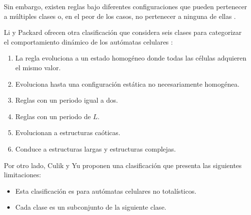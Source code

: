 Sin embargo, existen reglas bajo diferentes configuraciones que pueden pertenecer a múltiples clases o, en el peor de los casos, no pertenecer a ninguna de ellas \cite{genaro2000_campo_promedio}. 

Li y Packard ofrecen otra clasificación que considera seis clases para categorizar el comportamiento dinámico de los autómatas celulares \cite{Martinez2013note}:
\begin{enumerate}[label*=LP \Roman*]
	\item La regla evoluciona a un estado homogéneo donde todas las células adquieren el mismo valor.
	\item Evoluciona hasta una configuración estática no necesariamente homogénea.
	\item Reglas con un periodo igual a dos.
	\item Reglas con un periodo de $L$.
	\item Evolucionan a estructuras caóticas.
	\item Conduce a estructuras largas y estructuras complejas.
\end{enumerate}

Por otro lado, Culik y Yu \cite{Martinez2013note, culik1988_class} proponen una clasificación que presenta las siguientes limitaciones: 

\begin{itemize}
	\item Esta clasificación es para autómatas celulares no totalísticos. 
	\item Cada clase es un subconjunto de la siguiente clase.
\end{itemize}

